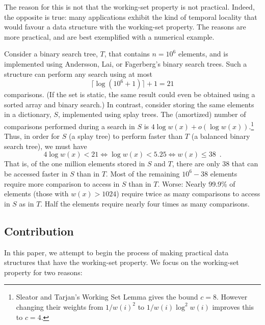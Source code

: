 \documentclass[lotsofwhite]{patmorin}
\begin{document}
The reason for this is not that the working-set property is not practical.
Indeed, the opposite is true: many applications exhibit the kind of
temporal locality that would favour a data structure with the working-set
property.  The reasons are more practical, and are best exemplified with a
numerical example.

Consider a binary search tree, $T$, that contains $n=10^6$ elements, and
is implemented using Andersson, Lai, or Fagerberg's binary search trees.
Such a structure can perform any search using at most
\[
   \lceil\log(10^6+1)\rceil+1= 21
\]
comparisons. (If the set is static, the same result could even be obtained
using a sorted array and binary search.)  In contrast, consider storing
the same elements in a dictionary, $S$, implemented using splay trees.
The (amortized) number of comparisons performed during a search in $S$
is $4\log w(x)+o(\log w(x))$.\footnote{Sleator and Tarjan's Working
    Set Lemma \cite{X} gives the bound $c=8$.  However changing their
    weights from $1/w(i)^2$ to $1/w(i)\log^2 w(i)$ improves this to
    $c=4$.}  Thus, in order for $S$
(a splay tree)
to perform faster than $T$ (a balanced binary search tree), we must have
\[
   4\log w(x) < 21 
       \Leftrightarrow \log w(x) < 5.25 
       \Leftrightarrow w(x) \le 38 \enspace .
\]
That is, of the one million elements stored in $S$ and $T$, there are
only 38 that can be accessed faster in $S$ than in $T$.  Most of the
remaining $10^6 - 38$ elements require more comparison to access in $S$
than in $T$.  Worse: Nearly 99.9\% of elements (those with $w(x)>1024$)
require twice as many comparisons to access in $S$ as in $T$.  Half the
elements require nearly four times as many comparisons.



\subsection{Contribution}

In this paper, we attempt to begin the process of making practical data
structures that have the working-set property.  We focus on the
working-set property for two reasons:
\end{document}
